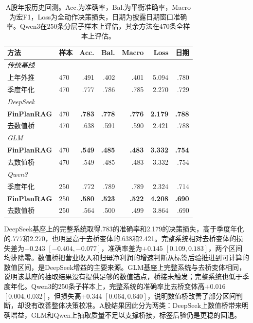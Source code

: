 \begin{table}[htbp]
\centering
{}
\setlength{\tabcolsep}{3pt}
\caption{A股年报历史回测。Acc.为准确率，Bal.为平衡准确率，Macro为宏F1，Loss为全动作决策损失，日期为披露日期窗口准确率。Qwen3在250条分层子样本上评估，其余方法在470条全样本上评估。}
\label{tab:ashare}
\begin{tabular}{llrrrrr}
\toprule
方法 & 样本 & Acc. & Bal. & Macro & Loss & 日期 \\
\midrule
\multicolumn{7}{l}{\textit{传统基线}} \\
上年外推 & 470 & .491 & .402 & .401 & 5.094 & .780 \\
季度年化 & 470 & .777 & .786 & .785 & 2.270 & .729 \\
\midrule
\multicolumn{7}{l}{\textit{DeepSeek}} \\
\textbf{FinPlanRAG} & 470 & \textbf{.783} & \textbf{.778} & \textbf{.776} & \textbf{2.179} & \textbf{.788} \\
去数值桥 & 470 & .638 & .591 & .590 & 2.421 & .788 \\
\midrule
\multicolumn{7}{l}{\textit{GLM}} \\
\textbf{FinPlanRAG} & 470 & \textbf{.549} & \textbf{.485} & \textbf{.483} & \textbf{3.332} & \textbf{.754} \\
去数值桥 & 470 & .549 & .485 & .483 & 3.332 & .754 \\
\midrule
\multicolumn{7}{l}{\textit{Qwen3}} \\
季度年化 & 250 & .772 & .789 & .789 & 2.324 & .714 \\
\textbf{FinPlanRAG} & 250 & \textbf{.580} & \textbf{.523} & \textbf{.522} & \textbf{4.208} & \textbf{.690} \\
去数值桥 & 250 & .564 & .500 & .499 & 3.864 & .690 \\
\bottomrule
\end{tabular}
\end{table}

DeepSeek基座上的完整系统取得.783的准确率和2.179的决策损失，高于季度年化的.777和2.270，也明显高于去桥变体的.638和2.421。完整系统相对去桥变体的损失差为$-0.243$ $[-0.404,-0.077]$，准确率差为$+0.145$ $[0.109,0.183]$，两个区间均排除零。数值桥把营业收入和归母净利润的增速判断从标签后验推进到可计算的数值区间，是DeepSeek增益的主要来源。GLM基座上完整系统与去桥变体相同，说明该基座的抽取结果没有提供足够的数值锚点，桥接未触发；完整系统也低于季度年化。Qwen3的250条子样本上，完整系统的准确率比去桥变体高$+0.016$ $[0.004,0.032]$，但损失高$+0.344$ $[0.064,0.640]$，说明数值桥改善了部分区间判断，却没有改善整体决策校准。A股结果因此分为两类：DeepSeek上数值桥带来明确增益，GLM和Qwen上抽取质量不足以支撑桥接，标签后验仍是更稳的回退。

